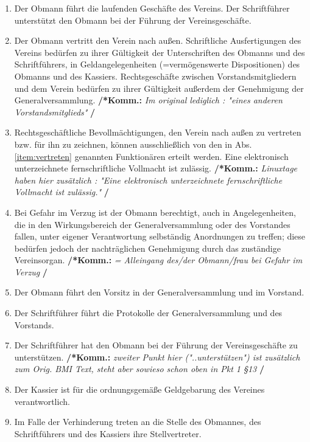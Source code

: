 \documentclass[a4paper,12pt]{article}
\newcommand{\comment}[1]{{\bf /*Komm.:} \textit{#1} {\bf */}}
\begin{document}
\begin{enumerate}
\item Der Obmann führt die laufenden Geschäfte des Vereins. Der Schriftführer unterstützt den Obmann bei der Führung der Vereinsgeschäfte.
\item \label{item:vertreten} Der Obmann vertritt den Verein nach außen.
Schriftliche Ausfertigungen des Vereins bedürfen zu ihrer Gültigkeit der Unterschriften des Obmanns und des Schriftführers, in Geldangelegenheiten (=vermögenswerte Dispositionen) des Obmanns und des Kassiers.
Rechtsgeschäfte zwischen Vorstandsmitgliedern und dem Verein bedürfen zu ihrer Gültigkeit außerdem der Genehmigung der Generalversammlung.
\comment{Im original lediglich : "eines anderen Vorstandsmitglieds"}
\item Rechtsgeschäftliche Bevollmächtigungen, den Verein nach außen zu vertreten bzw. für ihn zu zeichnen, können ausschließlich von den in Abs. \ref{item:vertreten} genannten Funktionären erteilt werden. Eine elektronisch unterzeichnete fernschriftliche Vollmacht ist zulässig.
\comment{Linuxtage haben hier zusätzlich : "Eine elektronisch unterzeichnete fernschriftliche Vollmacht ist zulässig." }
\item Bei Gefahr im Verzug ist der Obmann berechtigt, auch in Angelegenheiten, die in den Wirkungsbereich der Generalversammlung oder des Vorstandes fallen, unter eigener Verantwortung selbständig Anordnungen zu treffen; diese bedürfen jedoch der nachträglichen Genehmigung durch das zuständige Vereinsorgan.
\comment{ = Alleingang des/der Obmann/frau bei Gefahr im Verzug}
\item Der Obmann führt den Vorsitz in der Generalversammlung und im Vorstand.
\item Der Schriftführer führt die Protokolle der Generalversammlung und des Vorstands.
\item Der Schriftführer hat den Obmann bei der Führung der Vereinsgeschäfte zu unterstützen.
\comment{zweiter Punkt hier ("..unterstützen") ist zusätzlich zum Orig. BMI Text, steht aber sowieso schon oben in Pkt 1 §13}

\item Der Kassier ist für die ordnungsgemäße Geldgebarung des Vereines verantwortlich.

\item Im Falle der Verhinderung treten an die Stelle des Obmannes, des Schriftführers und des Kassiers ihre Stellvertreter.

\end{enumerate}
\end{document}
